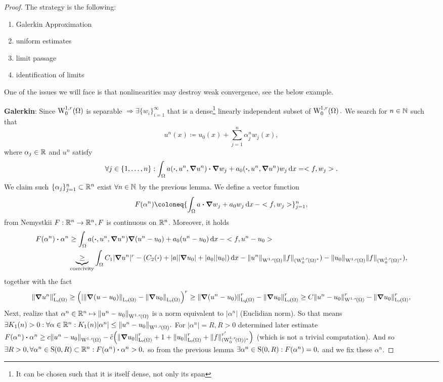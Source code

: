 \documentclass{article}
\begin{document}
\begin{proof}
	The strategy is the following:
	\begin{enumerate}
		\item Galerkin Approximation
		\item uniform estimates
		\item limit passage
		\item identification of limits
	\end{enumerate}
	One of the issues we will face is that nonlinearities may destroy weak convergence, see the below example. 

	\textbf{Galerkin}: Since $\WkpzeroSet[1][r]{\Omega}$ is separable $\Rightarrow \exists \{w_i\}_{i=1}^{\infty}$ that is a dense\footnote{It can be chosen such that it is itself dense, not only its span} linearly independent subset of $\WkpzeroSet[1][r]{\Omega}.$ We search for $n \in {\mathbb N}$ such that
	\[
		u^n(x) \coloneq u_0(x) + \sum_{j=1}^n \alpha_j^n w_j(x),
	\]
	where $\alpha_j \in {\mathbb R}$ and $u^n$ satisfy
	\[
		\forall j \in \{1, \dots, n\}: \int_{\Omega}a(\vdot, u^n, \grad u^n) \vdot \grad w_j + a_0\qty(\vdot,u^n,\grad u^n)w_j\dd{x} = <f,w_j>.
	\]
	We claim such $\{\alpha_j\}_{j=1}^n \subset {\mathbb R}^n$ exist $\forall n \in {\mathbb N}$ by the previous lemma. We define a vector function
	\[
		F\qty(\alpha^n)\coloneq \{ \int_{\Omega}a \vdot \grad w_j + a_0 w_j \dd{x} - <f,w_j>\}_{j=1}^n,
	\]
	from Nemystkii $F: {\mathbb R}^n \to {\mathbb R}^n, F$ is continuous on ${\mathbb R}^n$. Moreover, it holds
	\begin{align*}
		F\qty(\alpha^n) \vdot \alpha^n &\geq \int_{\Omega}a\qty(\vdot, u^n, \grad u^n)\grad\qty(u^n - u_0)+a_0  \qty(u^n-u_0)\dd{x} - <f,u^n-u_0> \\ &\underbrace{\geq}_{\text{coercivity}} \int_{\Omega}C_1 |\grad u^n|^r - \qty(C_2\qty(\vdot)+|a||\grad u_0| + |a_0| |u_0|)\dd{x} - \norm{u^n}_{\WkpSet[1][r]{\Omega}}\norm{f}_{(\WkpzeroSet[1][r]{\Omega}^{*}}) - \norm{u_0}_{\WkpSet[1][r]{\Omega}}\norm{f}_{(\WkpzeroSet[1][r]{\Omega}^{*}}),
	\end{align*}
	together with the fact
	\[
		\norm{\grad u^n}_{\LpSet[r]{\Omega}}^r \geq \qty(|\norm{\grad \qty(u-u_0)}_{\LpSet[r]{\Omega}}-\norm{\grad u_0}_{\LpSet[r]{\Omega}})^r \geq \norm{\grad\qty(u^n-u_0)}_{\LpSet[q]{\Omega}}^r-\norm{\grad u_0}_{\LpSet[r]{\Omega}}^r \geq C \norm{u^n-u_0}_{\WkpSet[1][r]{\Omega}}^r - \norm{\grad u_0}_{\LpSet[r]{\Omega}}^r,
	\]
	Next, realize that $ \alpha^n \in \R^n \mapsto \norm{u^n-u_0}_{\WkpSet[1][r]{\Omega}}$ is a norm equivalent to $|\alpha^n|$ (Euclidian norm). So that means $\exists K_1(n) >0: \forall \alpha \in \R^n: K_1(n) |\alpha^n| \leq \norm{u^n-u_0}_{\WkpSet[1][r]{\Omega}}.$ For $|\alpha^n| = R, R>0$ determined later estimate $F\qty(\alpha^n)\vdot \alpha^n \geq c \norm{u^n-u_0}_{\WkpSet[1][r]{\Omega}} - \tilde{c}\qty(\norm{\grad u_0}_{\LpSet[r]{\Omega}}^r+1+\norm{u_0}_{\LpSet[r]{\Omega}}^r + \norm{f}_{(\WkpzeroSet[1][r]{\Omega})^{*}}^{r'})$ (which is not a trivial computation). And so $\exists R>0, \forall \alpha^n \in \text{S}(0,R) \subset \R^n: F(\alpha^n) \vdot \alpha^n >0,$ so from the previous lemma $\exists \alpha^n \in \text{S}(0,R): F\qty(\alpha^n) = 0,$ and we fix these $\alpha^n$.

\end{proof}
\end{document}
